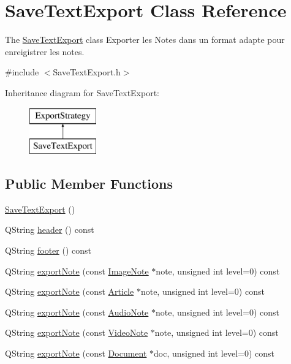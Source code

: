 \hypertarget{class_save_text_export}{\section{Save\-Text\-Export Class Reference}
\label{class_save_text_export}
}


The \hyperlink{class_save_text_export}{Save\-Text\-Export} class Exporter les Notes dans un format adapte pour enreigistrer les notes.  




{\ttfamily \#include $<$Save\-Text\-Export.\-h$>$}

Inheritance diagram for Save\-Text\-Export\-:\begin{figure}[H]
\begin{center}
\leavevmode
\includegraphics[height=2.000000cm]{class_save_text_export}
\end{center}
\end{figure}
\subsection*{Public Member Functions}
\begin{DoxyCompactItemize}
\item 
\hyperlink{class_save_text_export_ae1ef58f6741114681fc04cacc0627324}{Save\-Text\-Export} ()
\item 
Q\-String \hyperlink{class_save_text_export_a23798c1a4ce98f1e728f5cd65f1b7c8e}{header} () const 
\item 
Q\-String \hyperlink{class_save_text_export_ae289ae6803bccb8822ee48a519be17e5}{footer} () const 
\item 
Q\-String \hyperlink{class_save_text_export_a33246074d66b6876f4223c964f9c2ada}{export\-Note} (const \hyperlink{class_image_note}{Image\-Note} $\ast$note, unsigned int level=0) const 
\item 
Q\-String \hyperlink{class_save_text_export_ac88953e2ab46c89b15d29f5804167535}{export\-Note} (const \hyperlink{class_article}{Article} $\ast$note, unsigned int level=0) const 
\item 
Q\-String \hyperlink{class_save_text_export_a33528d148c683ba36062b24fda47266f}{export\-Note} (const \hyperlink{class_audio_note}{Audio\-Note} $\ast$note, unsigned int level=0) const 
\item 
Q\-String \hyperlink{class_save_text_export_ab8847dc45526ea5183e351baa1aa679a}{export\-Note} (const \hyperlink{class_video_note}{Video\-Note} $\ast$note, unsigned int level=0) const 
\item 
Q\-String \hyperlink{class_save_text_export_a12176f8431eae2caeb7c99d7162f5c23}{export\-Note} (const \hyperlink{class_document}{Document} $\ast$doc, unsigned int level=0) const 
\end{DoxyCompactItemize}
